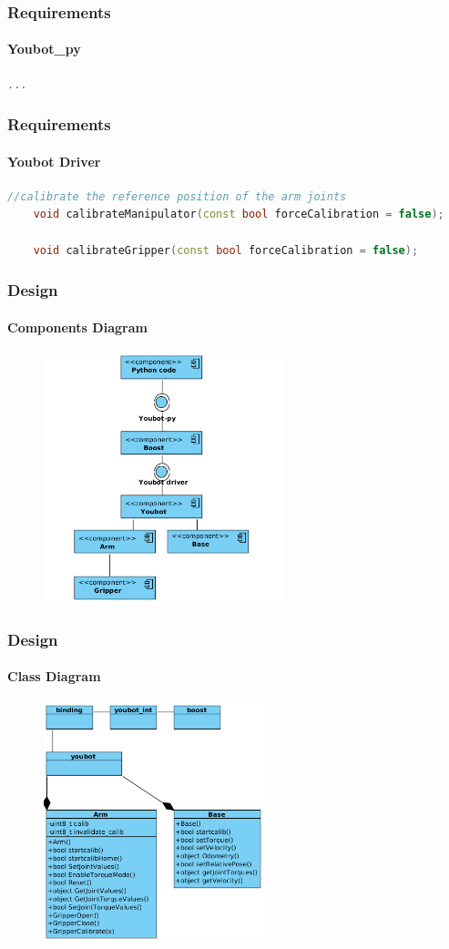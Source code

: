 \documentclass{beamer}
\begin{document}
\begin{frame}[fragile]
 \frametitle{Requirements}
 \framesubtitle{Youbot\_py}
\begin{lstlisting}[language=C++]
...
\end{lstlisting}
\end{frame}

\begin{frame}[fragile]
 \frametitle{Requirements}
 \framesubtitle{Youbot Driver}
 \begin{lstlisting}[language=C++]
//calibrate the reference position of the arm joints
    void calibrateManipulator(const bool forceCalibration = false);

    void calibrateGripper(const bool forceCalibration = false);
\end{lstlisting}
\end{frame}







\begin{frame}
 \frametitle{Design}
 \framesubtitle{Components Diagram}
  \begin{figure}[ht!]
  \centering
  \includegraphics[width=70mm]{img/components.png}
  \caption{}
  \label{Component Diagram}
  \end{figure} 
\end{frame}


\begin{frame}
 \frametitle{Design}
 \framesubtitle{Class Diagram}
  \begin{figure}[ht!]
  \centering
  \includegraphics[width=64mm]{img/classdiagramm.png}
  \caption{}
  \label{Class Diagram}
  \end{figure}
 
\end{frame}
\end{document}
